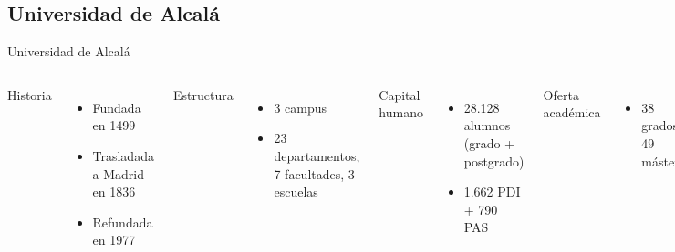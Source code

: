 \documentclass[10pt,compress]{beamer} %
\begin{document}
\subsection{Universidad de Alcalá}

\begin{frame}{Universidad de Alcalá}
    \begin{columns}
         Historia
        \begin{itemize}
            \item Fundada en 1499
            \item Trasladada a Madrid en 1836
            \item Refundada en 1977
        \end{itemize}
        Estructura
        \begin{itemize}
            \item 3 campus
            \item 23 departamentos, 7 facultades, 3 escuelas
        \end{itemize}
        Capital humano
        \begin{itemize}
            \item 28.128 alumnos (grado + postgrado)
            \item 1.662 PDI + 790 PAS
        \end{itemize}
        Oferta académica
        \begin{itemize}
            \item 38 grados, 49 másteres
        \end{itemize}
            \includegraphics[width=\linewidth]{figs/03_logo-vC_pant293.pdf}\\

\end{columns}
\end{frame}
\end{document}
